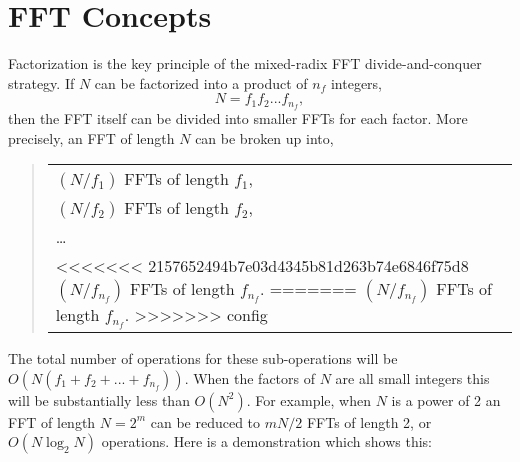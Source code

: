 \documentclass[fleqn,12pt]{article}
\begin{document}
\section{FFT Concepts}
%
Factorization is the key principle of the mixed-radix FFT divide-and-conquer
strategy. If $N$ can be factorized into a product of $n_f$ integers,
%
\begin{equation}
N = f_1 f_2 ... f_{n_f} ,
\end{equation}
%
then the FFT itself can be divided into smaller FFTs for each factor.
More precisely, an FFT of length $N$ can be broken up into,
%
\begin{quote}
\begin{tabular}{l}
$(N/f_1)$ FFTs of length $f_1$, \\
$(N/f_2)$ FFTs of length $f_2$, \\
\dots \\
<<<<<<< 2157652494b7e03d4345b81d263b74e6846f75d8
$(N/f_{n_f})$ FFTs of length $f_{n_f}$. 
=======
$(N/f_{n_f})$ FFTs of length $f_{n_f}$.
>>>>>>> config
\end{tabular}
\end{quote}
%
The total number of operations for these sub-operations will be $O(
N(f_1 + f_2 + ... + f_{n_f}))$. When the factors of $N$ are all small
integers this will be substantially less than $O(N^2)$. For example,
when $N$ is a power of 2 an FFT of length $N=2^m$ can be reduced to $m
N/2$ FFTs of length 2, or $O(N\log_2 N)$ operations.  Here is a
demonstration which shows this:
\end{document}
